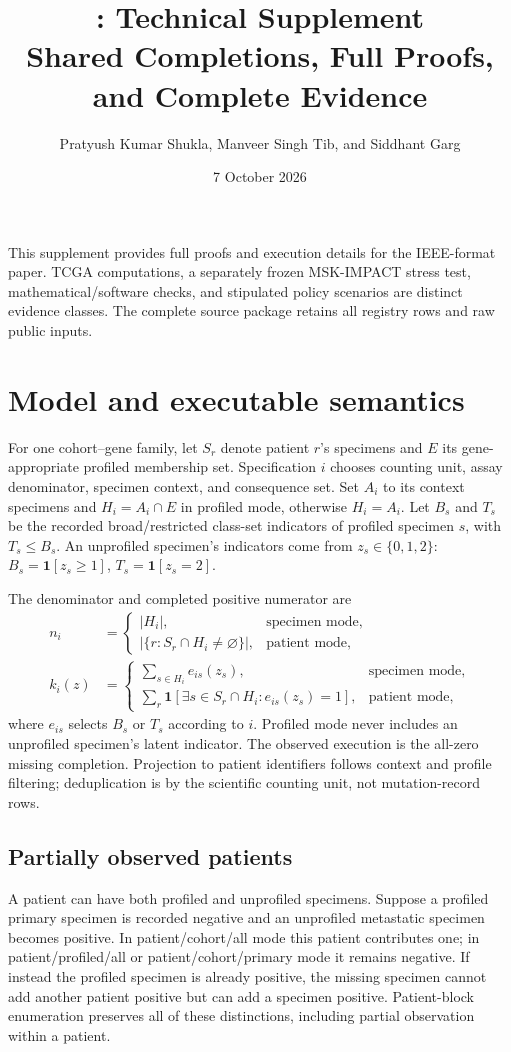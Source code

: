 \documentclass[10pt,letterpaper]{article}
\title{\CLARA{}: Technical Supplement\\Shared Completions, Full Proofs, and Complete Evidence}
\author{Pratyush Kumar Shukla, Manveer Singh Tib, and Siddhant Garg}
\date{7 October 2026}
\begin{document}
\maketitle
\noindent This supplement provides full proofs and execution details for the IEEE-format paper. TCGA computations, a separately frozen MSK-IMPACT stress test, mathematical/software checks, and stipulated policy scenarios are distinct evidence classes. The complete source package retains all registry rows and raw public inputs.

\section{Model and executable semantics}
For one cohort--gene family, let $S_r$ denote patient $r$'s specimens and $E$ its gene-appropriate profiled membership set. Specification $i$ chooses counting unit, assay denominator, specimen context, and consequence set. Set $A_i$ to its context specimens and $H_i=A_i\cap E$ in profiled mode, otherwise $H_i=A_i$. Let $B_s$ and $T_s$ be the recorded broad/restricted class-set indicators of profiled specimen $s$, with $T_s\leq B_s$. An unprofiled specimen's indicators come from $z_s\in\{0,1,2\}$: $B_s=\mathbf1[z_s\geq1]$, $T_s=\mathbf1[z_s=2]$.

The denominator and completed positive numerator are
\begin{align}
 n_i&=\begin{cases}|H_i|,&\text{specimen mode},\\|\{r:S_r\cap H_i\ne\varnothing\}|,&\text{patient mode},\end{cases}\\
 k_i(z)&=\begin{cases}\sum_{s\in H_i} e_{is}(z_s),&\text{specimen mode},\\
 \sum_r\mathbf1[\exists s\in S_r\cap H_i:e_{is}(z_s)=1],&\text{patient mode},\end{cases}
\end{align}
where $e_{is}$ selects $B_s$ or $T_s$ according to $i$. Profiled mode never includes an unprofiled specimen's latent indicator. The observed execution is the all-zero missing completion. Projection to patient identifiers follows context and profile filtering; deduplication is by the scientific counting unit, not mutation-record rows.

\subsection{Partially observed patients}
A patient can have both profiled and unprofiled specimens. Suppose a profiled primary specimen is recorded negative and an unprofiled metastatic specimen becomes positive. In patient/cohort/all mode this patient contributes one; in patient/profiled/all or patient/cohort/primary mode it remains negative. If instead the profiled specimen is already positive, the missing specimen cannot add another patient positive but can add a specimen positive. Patient-block enumeration preserves all of these distinctions, including partial observation within a patient.
\end{document}
